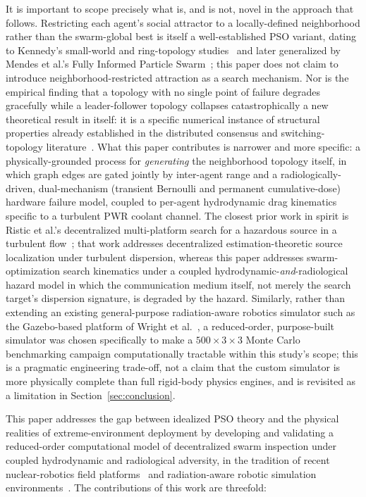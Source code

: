 \documentclass[journal]{IEEEtran}
\begin{document}
It is important to scope precisely what is, and is not, novel in the approach that follows. Restricting each agent's social attractor to a locally-defined neighborhood rather than the swarm-global best is itself a well-established PSO variant, dating to Kennedy's small-world and ring-topology studies~\cite{kennedy_small_worlds} and later generalized by Mendes et al.'s Fully Informed Particle Swarm~\cite{mendes_fips}; this paper does not claim to introduce neighborhood-restricted attraction as a search mechanism. Nor is the empirical finding that a topology with no single point of failure degrades gracefully while a leader-follower topology collapses catastrophically a new theoretical result in itself: it is a specific numerical instance of structural properties already established in the distributed consensus and switching-topology literature~\cite{olfati_saber_murray,ren_beard}. What this paper contributes is narrower and more specific: a physically-grounded process for \emph{generating} the neighborhood topology itself, in which graph edges are gated jointly by inter-agent range and a radiologically-driven, dual-mechanism (transient Bernoulli and permanent cumulative-dose) hardware failure model, coupled to per-agent hydrodynamic drag kinematics specific to a turbulent PWR coolant channel. The closest prior work in spirit is Ristic et al.'s decentralized multi-platform search for a hazardous source in a turbulent flow~\cite{ristic_turbulent_search}; that work addresses decentralized estimation-theoretic source localization under turbulent dispersion, whereas this paper addresses swarm-optimization search kinematics under a coupled hydrodynamic-\emph{and}-radiological hazard model in which the communication medium itself, not merely the search target's dispersion signature, is degraded by the hazard. Similarly, rather than extending an existing general-purpose radiation-aware robotics simulator such as the Gazebo-based platform of Wright et al.~\cite{wright_gazebo_radiation}, a reduced-order, purpose-built simulator was chosen specifically to make a $500\times3\times3$ Monte Carlo benchmarking campaign computationally tractable within this study's scope; this is a pragmatic engineering trade-off, not a claim that the custom simulator is more physically complete than full rigid-body physics engines, and is revisited as a limitation in Section~\ref{sec:conclusion}.

This paper addresses the gap between idealized PSO theory and the physical realities of extreme-environment deployment by developing and validating a reduced-order computational model of decentralized swarm inspection under coupled hydrodynamic and radiological adversity, in the tradition of recent nuclear-robotics field platforms~\cite{groves_mallard,nancekievill_avexis} and radiation-aware robotic simulation environments~\cite{wright_gazebo_radiation}. The contributions of this work are threefold:
\end{document}
